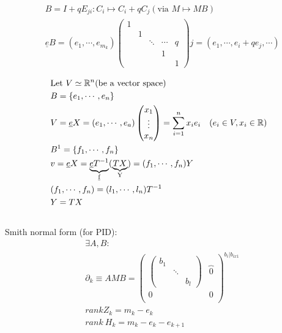 \documentclass[11pt,a4paper]{report}
\begin{document}
              \begin{align*}
                &B = I + qE_{ji}: C_i \mapsto C_i + qC_j (\textrm{via } M \mapsto MB)\\
                &\underline{e}B = (e_1, \cdots, e_{m_{k}})\begin{pmatrix}1 &&&& \\ & 1 &&& \\ && \ddots & \cdots & q\\ &&& 1 &\\ &&&& 1\end{pmatrix}j = (e_1, \cdots, e_i + qe_j, \cdots)\\
              \end{align*}
              \begin{align*}
                &\textrm{Let } V \simeq \mathbb{\mathbb{R}}^n (\textrm{be a vector space})\\
                &B = \{e_1, \cdots, e_n\}\\
                &V = \underline{e}X = (e_1, \cdots, e_a)\begin{pmatrix}x_1\\\vdots\\x_n\end{pmatrix}= \sum_{i=1}^nx_ie_i \quad (e_i \in V, x_i \in \mathbb{R})\\
                &B^1 = \{f_1, \cdots, f_n\}\\
                &v = \underline{e}X = \underbrace{\underline{e} T^{-1}}_\text{\underline{f}}(\underbrace{TX}_\text{Y})= (f_1, \cdots, f_n) Y\\
                &(f_1, \cdots, f_n) = (l_1, \cdots, l_n) T^{-1}\\
                &Y = TX \\
                \end{align*}
              \\
              Smith normal form (for PID):
              \begin{align*}
                &\exists A, B:\\
                &\partial_k \equiv AMB = \left(\begin{array}{c|c}
                               \begin{pmatrix}b_1 && \\ & \ddots & \\ && b_l\end{pmatrix}& \overbrace{0}^\text{}\\
                               \hline
                               0 & 0 \\
                             \end{array}\right)^{b_{i} | b_{ix1}}
                \\
                &rank Z_k = m_k - e_k\\
                &rank\ H_k = m_k - e_k - e_{k+1}
              \end{align*}
              \\
\end{document}
